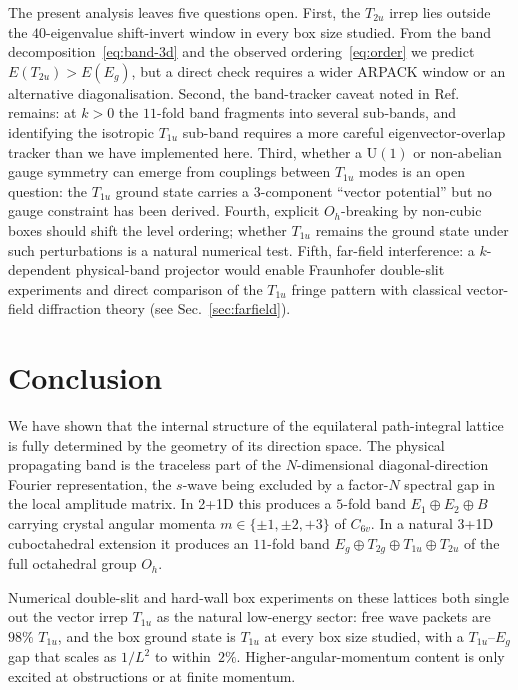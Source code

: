 \documentclass[twocolumn,showpacs,preprintnumbers,amsmath,amssymb]{revtex4-2}
\newcommand{\Oh}{O_{h}}
\newcommand{\Csix}{C_{6v}}
\begin{document}
The present analysis leaves five questions open.
First, the $T_{2u}$ irrep lies outside the $40$-eigenvalue shift-invert
window in every box size studied.
From the band decomposition~\eqref{eq:band-3d} and the observed
ordering~\eqref{eq:order} we predict $E(T_{2u})>E(E_{g})$, but a direct
check requires a wider ARPACK window or an alternative diagonalisation.
Second, the band-tracker caveat noted in Ref.~\cite{schmiereck2026}
remains: at $k>0$ the $11$-fold band fragments into several sub-bands,
and identifying the isotropic $T_{1u}$ sub-band requires a more
careful eigenvector-overlap tracker than we have implemented here.
Third, whether a $\mathrm{U}(1)$ or non-abelian gauge symmetry can
emerge from couplings between $T_{1u}$ modes is an open question: the
$T_{1u}$ ground state carries a $3$-component ``vector potential''
but no gauge constraint has been derived.
Fourth, explicit $\Oh$-breaking by non-cubic boxes should shift the
level ordering; whether $T_{1u}$ remains the ground state under such
perturbations is a natural numerical test.
Fifth, far-field interference: a $k$-dependent physical-band projector
would enable Fraunhofer double-slit experiments and direct comparison
of the $T_{1u}$ fringe pattern with classical vector-field diffraction
theory (see Sec.~\ref{sec:farfield}).

\section{Conclusion}
\label{sec:conclusion}

We have shown that the internal structure of the equilateral
path-integral lattice is fully determined by the geometry of its
direction space.
The physical propagating band is the traceless part of the
$N$-dimensional diagonal-direction Fourier representation, the $s$-wave
being excluded by a factor-$N$ spectral gap in the local amplitude
matrix.
In \mbox{2\!+\!1D} this produces a $5$-fold band
$E_{1}\oplus E_{2}\oplus B$ carrying crystal angular momenta
$m\in\{\pm 1,\pm 2,+3\}$ of $\Csix$.
In a natural \mbox{3\!+\!1D} cuboctahedral extension it produces an
$11$-fold band
$E_{g}\oplus T_{2g}\oplus T_{1u}\oplus T_{2u}$ of the full octahedral
group $\Oh$.

Numerical double-slit and hard-wall box experiments on these
lattices both single out the vector irrep $T_{1u}$ as the natural
low-energy sector: free wave packets are $98\%$ $T_{1u}$, and the
box ground state is $T_{1u}$ at every box size studied, with a
$T_{1u}$--$E_{g}$ gap that scales as $1/L^{2}$ to within~$2\%$.
Higher-angular-momentum content is only excited at obstructions
or at finite momentum.
\end{document}
